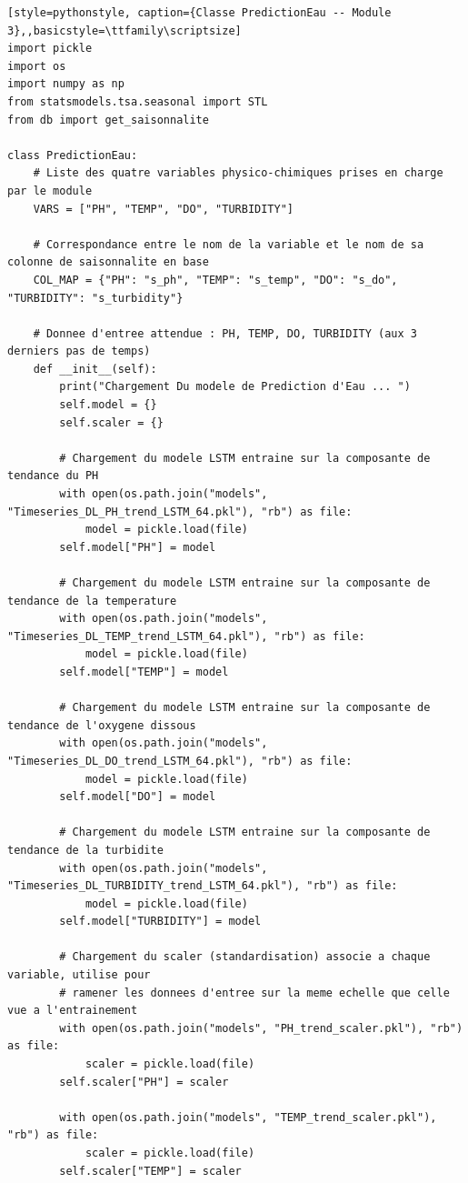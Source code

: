 \documentclass[a4paper,12pt, oneside]{article}
\begin{document}
\begin{lstlisting}[style=pythonstyle, caption={Classe PredictionEau -- Module 3},,basicstyle=\ttfamily\scriptsize]
import pickle
import os
import numpy as np
from statsmodels.tsa.seasonal import STL
from db import get_saisonnalite

class PredictionEau:
    # Liste des quatre variables physico-chimiques prises en charge par le module
    VARS = ["PH", "TEMP", "DO", "TURBIDITY"]

    # Correspondance entre le nom de la variable et le nom de sa colonne de saisonnalite en base
    COL_MAP = {"PH": "s_ph", "TEMP": "s_temp", "DO": "s_do", "TURBIDITY": "s_turbidity"}

    # Donnee d'entree attendue : PH, TEMP, DO, TURBIDITY (aux 3 derniers pas de temps)
    def __init__(self):
        print("Chargement Du modele de Prediction d'Eau ... ")
        self.model = {}
        self.scaler = {}

        # Chargement du modele LSTM entraine sur la composante de tendance du PH
        with open(os.path.join("models", "Timeseries_DL_PH_trend_LSTM_64.pkl"), "rb") as file:
            model = pickle.load(file)
        self.model["PH"] = model

        # Chargement du modele LSTM entraine sur la composante de tendance de la temperature
        with open(os.path.join("models", "Timeseries_DL_TEMP_trend_LSTM_64.pkl"), "rb") as file:
            model = pickle.load(file)
        self.model["TEMP"] = model

        # Chargement du modele LSTM entraine sur la composante de tendance de l'oxygene dissous
        with open(os.path.join("models", "Timeseries_DL_DO_trend_LSTM_64.pkl"), "rb") as file:
            model = pickle.load(file)
        self.model["DO"] = model

        # Chargement du modele LSTM entraine sur la composante de tendance de la turbidite
        with open(os.path.join("models", "Timeseries_DL_TURBIDITY_trend_LSTM_64.pkl"), "rb") as file:
            model = pickle.load(file)
        self.model["TURBIDITY"] = model

        # Chargement du scaler (standardisation) associe a chaque variable, utilise pour
        # ramener les donnees d'entree sur la meme echelle que celle vue a l'entrainement
        with open(os.path.join("models", "PH_trend_scaler.pkl"), "rb") as file:
            scaler = pickle.load(file)
        self.scaler["PH"] = scaler

        with open(os.path.join("models", "TEMP_trend_scaler.pkl"), "rb") as file:
            scaler = pickle.load(file)
        self.scaler["TEMP"] = scaler


\end{lstlisting}
\end{document}
